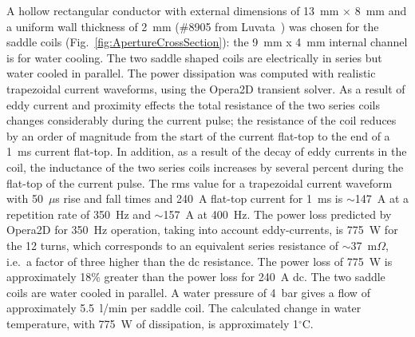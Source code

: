 \documentclass[aps,prab,twocolumn,superscriptaddress]{revtex4-1}
\begin{document}
A hollow rectangular conductor with external dimensions of  13~mm $\times$ 8~mm and a uniform wall thickness of 2~mm (\#8905 from Luvata~\cite{Luvata}) was chosen for the saddle coils (Fig.~\ref{fig:ApertureCrossSection}): the 9~mm x 4~mm internal channel is  for water cooling. The two saddle shaped coils are electrically in series but water cooled in parallel. The power dissipation was computed with realistic trapezoidal current waveforms, using the Opera2D transient solver. As a result of eddy current and proximity effects the total resistance of the two series coils changes considerably during the current pulse; the resistance of the coil reduces by an order of magnitude from the start of the current flat-top to the end of a 1~ms current flat-top. In addition, as a result of the decay of eddy currents in the coil, the inductance of the two series coils increases by several percent during the flat-top of the current pulse. The rms value  for a trapezoidal current waveform with 50~$\mu$s rise and fall times and 240~A flat-top current for 1~ms is $\sim$147~A at a repetition rate of 350~Hz and $\sim$157~A at 400~Hz. The power loss predicted by Opera2D for 350~Hz operation, taking into account eddy-currents, is 775~W for the 12 turns, which corresponds to an equivalent series resistance of $\sim$37~m$\Omega$, i.e.~a factor of three higher than the dc resistance. The power loss of 775~W is approximately 18\% greater than the power loss for 240~A dc. The two saddle coils are water cooled in parallel. A water pressure of 4~bar gives a flow of approximately 5.5~l/min per saddle coil. The calculated change in water temperature, with 775~W of dissipation, is approximately 1$^\circ$C. 
\end{document}
